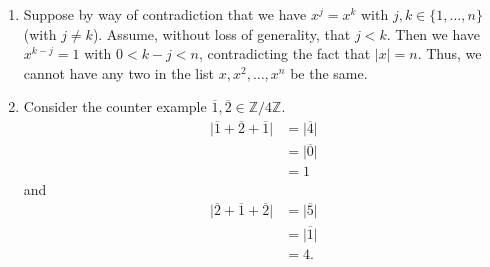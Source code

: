 \documentclass[12 pt, letterpaper]{hmcpset}
\begin{document}
\begin{solution}
\begin{enumerate}
			This is only true if $G$ is abelian. Consider on any non-abelian group  $\varphi : G \to G$  by $g \mapsto g^{-1}$ . Note that we have $g, h \in G$  such that $g h \neq h g$ . Then consider that
			\[
				\begin{split}
					\varphi(g^{-1} h^{-1}) & = (g^{-1} h^{-1})^{-1} \\
							       & = hg \\
				\end{split}
			\]
			and
			\[
				\begin{split}
					\varphi(g^{-1}) \varphi(h^{-1}) & = (g^{-1})^{-1} (h^{-1})^{-1} \\
									& = gh
				\end{split}
			\]
			mean that $\varphi(g^{-1} h^{-1}) \neq \varphi(g^{-1}) \varphi(h^{-1})$ and thus, $\varphi$ is not a homomorphism.
		\item {} 

			Suppose by way of contradiction that we have $x^{j} = x^{k}$ with $j, k \in \{ 1, \dots, n \}$ (with $j \neq k$). Assume, without loss of generality, that $j < k$. Then we have $x^{k - j} = 1$ with $0< k - j < n$, contradicting the fact that $\vert x \vert = n$. Thus, we cannot have any two in the list $x, x^{2}, \dots, x^{n}$ be the same.
		\item {} 

			Consider the counter example $\overline{1}, \overline{2} \in \mathbb{Z}/4\mathbb{Z}$. 
			\[
				\begin{split}
					\vert \overline{1} + \overline{2} + \overline{1} \vert & = \vert \overline{4} \vert \\
											       & = \vert \overline{0} \vert \\
											       & = 1
				\end{split}
			\]
			and
			\[
				\begin{split}
					\vert \overline{2} + \overline{1} + \overline{2} \vert & = \vert \overline{5} \vert \\
											       & = \vert \overline{1} \vert \\
											       & = 4.
				\end{split}
			\]
	\end{enumerate}
\end{solution}
\end{document}
